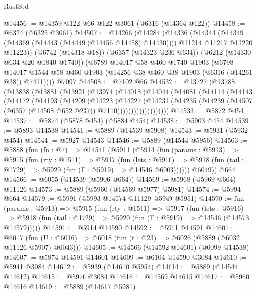 \begin{lexlean}{RustStd}
\begin{coremodule}
@14456 := @14359 @122 @66 @122 @3061 (@6316 (@14364 @122))
@14458 := @6324 (@6325 @3061)
@14507 := @14266
    (@14284
      (@14336
        (@14344
          (@14349 (@14369 (@14443 (@14449 (@14456 @14458) @14430))))
          @11214
          @11217
          @11220
          @11223))
      (@6742 (@14318 @18))
      (@6357 (@14323 @236 @634))
      (@6212 (@14330 @634 @20 @1840 @1740))
      (@6789
        @14017
        @58
        @460
        @1740
        @1903
        (@6798 @14017 @1544 @58 @460 @1903 (@14256 @38 @460 @38 @1903 (@6316 (@14261 @38)) @7411))))
    @7097
@14508 := @7102 @66
@14532 := @13727
    (@13788
      (@13838
        (@13881
          (@13921
            (@13974
              (@14018
                (@14044
                  (@14081
                    (@14114
                      (@14143
                        (@14172
                          (@14193
                            (@14209
                              (@14223
                                (@14227
                                  (@14231
                                    (@14235
                                      (@14239
                                        (@14507 (@6357 (@14508 @652 @237)) @7110)))))))))))))))))))
@14533 := @5872 @454
@14537 := @5874 (@5878 @454) (@5884 @454)
@14538 := @5903 @454
@14539 := @5893 @14538
@14541 := @5889 (@14539 @5908)
@14543 := @5931 (@5932 @454)
@14544 := @5927 @14543
@14546 := @5889 (@14544 @5956)
@14563 := @5888
    (fun (fn : @7) =>
    @14541
      (@5911
        (@5914
          (fun (params : @5913) =>
          @5915
            (fun (rty : @1511) =>
            @5917
              (fun (lets : @5916) =>
              @5918 (fun (tail : @1729) => @5920 (fun (Γ : @5919) => @14546 @6003))))))
        @6049))
    @664
@14566 := @6055 (@14539 (@5906 @664))
@14569 := @5968 (@5969 @664) @11126
@14573 := @5889 (@5960 (@14569 @5977) @5981)
@14574 := @5994 @664
@14579 := @5991 (@5993 @14574 @11129 @5949 @5951)
@14590 := fun (params : @5913) =>
  @5915
    (fun (rty : @1511) =>
    @5917
      (fun (lets : @5916) =>
      @5918 (fun (tail : @1729) => @5920 (fun (Γ : @5919) => @14546 (@14573 @14579)))))
@14591 := @5914 @14590
@14592 := @5911 @14591
@14601 := @6017
    (fun (U : @6016) => @6018 (fun (t : @23) => @6026 (@5889 (@6032 @11126 @5907) @6043)))
@14605 := @14566 (@14592 @14601) (@6099 @14538)
@14607 := @5874 @14591 @14601
@14609 := @6104 @14590 @3084
@14610 := @5941 @3084
@14612 := @5939 (@14610 @5954)
@14614 := @5889 (@14544 @14612)
@14615 := @5976 @3084
@14616 := @14569 @14615
@14617 := @5960 @14616
@14619 := @5889 (@14617 @5981)

\end{coremodule}
\end{lexlean}
